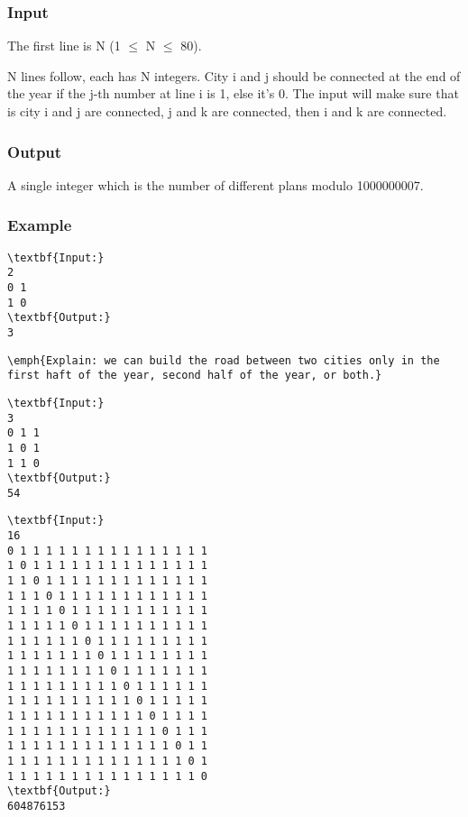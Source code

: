 \subsubsection{   Input  }

   The first line is N (1  $\le$  N  $\le$  80).  

   N lines follow, each has N integers. City i and j should be connected at the end of the year if the j-th number at line i is 1, else it's 0. The input will make sure that is city i and j are connected, j and k are connected, then i and k are connected.  

\subsubsection{   Output  }

   A single integer which is the number of different plans modulo 1000000007.  

\subsubsection{   Example  }
\begin{verbatim}
\textbf{Input:}
2
0 1
1 0
\textbf{Output:}
3\end{verbatim}
\begin{verbatim}
\emph{Explain: we can build the road between two cities only in the first haft of the year, second half of the year, or both.}\end{verbatim}
\begin{verbatim}
\textbf{Input:}
3
0 1 1
1 0 1
1 1 0
\textbf{Output:}
54
\end{verbatim}
\begin{verbatim}
\textbf{Input:}
16
0 1 1 1 1 1 1 1 1 1 1 1 1 1 1 1
1 0 1 1 1 1 1 1 1 1 1 1 1 1 1 1
1 1 0 1 1 1 1 1 1 1 1 1 1 1 1 1
1 1 1 0 1 1 1 1 1 1 1 1 1 1 1 1
1 1 1 1 0 1 1 1 1 1 1 1 1 1 1 1
1 1 1 1 1 0 1 1 1 1 1 1 1 1 1 1
1 1 1 1 1 1 0 1 1 1 1 1 1 1 1 1
1 1 1 1 1 1 1 0 1 1 1 1 1 1 1 1
1 1 1 1 1 1 1 1 0 1 1 1 1 1 1 1
1 1 1 1 1 1 1 1 1 0 1 1 1 1 1 1
1 1 1 1 1 1 1 1 1 1 0 1 1 1 1 1
1 1 1 1 1 1 1 1 1 1 1 0 1 1 1 1
1 1 1 1 1 1 1 1 1 1 1 1 0 1 1 1
1 1 1 1 1 1 1 1 1 1 1 1 1 0 1 1
1 1 1 1 1 1 1 1 1 1 1 1 1 1 0 1
1 1 1 1 1 1 1 1 1 1 1 1 1 1 1 0
\textbf{Output:}
604876153\end{verbatim}
